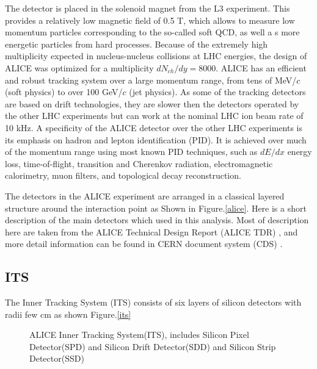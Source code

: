 The detector is placed in the solenoid magnet from the L3 experiment. This provides a relatively low magnetic field of 0.5 T, which allows to measure low momentum particles corresponding to the so-called soft QCD, as well a s more energetic particles from hard processes. Because of the extremely high multiplicity expected in nucleus-nucleus collisions at LHC energies, the design of ALICE was optimized for a multiplicity $dN_{ch}/dy = 8000$. ALICE has an efficient and robust tracking system over a large momentum range, from tens of MeV/$c$ (soft physics) to over 100 GeV/$c$ (jet physics). As some of the tracking detectors are based on drift technologies, they are slower then the detectors operated by the other LHC experiments but can work at the nominal LHC ion beam rate of 10 kHz. A specificity of the ALICE detector over the other LHC experiments is its emphasis on hadron and lepton identification (PID). It is achieved over much of the momentum range using most known PID techniques, such as $dE/dx$ energy loss, time-of-flight, transition and Cherenkov radiation, electromagnetic calorimetry, muon filters, and topological decay reconstruction.

The detectors in the ALICE experiment are arranged in a classical layered structure around the interaction point as Shown in Figure.\ref{alice}. Here is a short description of the main detectors which used in this analysis. Most of description here are taken from the ALICE Technical Design Report (ALICE TDR) \cite{Cortese:879894}, and more detail information can be found in CERN document system (CDS) \cite{cds}.



\subsection{ITS}

The Inner Tracking System (ITS) consists of six layers of silicon detectors with radii few cm as shown Figure.\ref{its}

     \begin{figure}[!h]
		\begin{center}
        	\caption{ALICE Inner Tracking System(ITS), includes Silicon Pixel Detector(SPD) and Silicon Drift Detector(SDD) and Silicon Strip Detector(SSD)}
        	\label{fig:its}
        \end{center}
    \end{figure}


